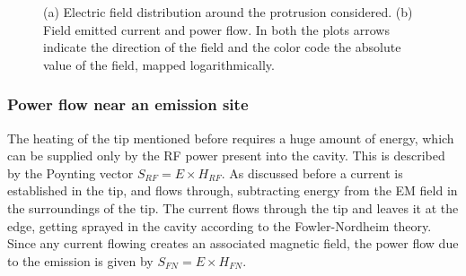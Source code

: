  \begin{figure}
 \centering
 \hspace{5mm}
 \caption{(a) Electric field distribution around the protrusion considered. (b) Field emitted current and power flow. In both the plots arrows indicate the direction of the field and the color code the absolute value of the field, mapped logarithmically.\cite{Grudiev:newLoc} }
 \label{figure_S_c}
 
 \end{figure}



\subsubsection{Power flow near an emission site}

The heating of the tip mentioned before requires a huge amount of energy, which can be supplied only by the RF power present into the cavity. This is described by the Poynting vector $S_{RF} = E\times H_{RF}$. As discussed before a current is established in the tip, and flows through, subtracting energy from the EM field in the surroundings of the tip. The current flows through the tip and leaves it at the edge, getting sprayed in the cavity according to the Fowler-Nordheim theory. Since any current flowing creates an associated magnetic field, the power flow due to the emission is given by $S_{FN}=E\times H_{FN}$. 

